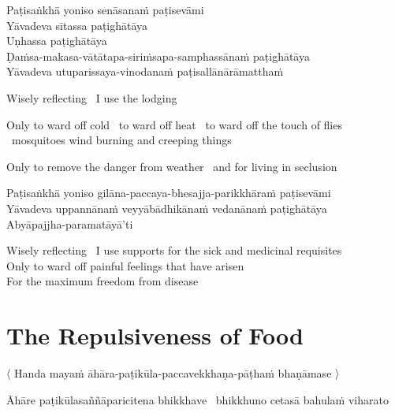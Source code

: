 Paṭisaṅkhā yoniso senāsanaṁ paṭisevāmi\\
Yāvadeva sītassa paṭighātāya\\
Uṇhassa paṭighātāya\\
Ḍaṁsa-makasa-vātātapa-siriṁsapa-samphassānaṁ paṭighātāya\\
Yāvadeva utuparissaya-vinodanaṁ paṭisallānārāmatthaṁ

\begin{english-keepwith}
  Wisely reflecting \breathmark\ I use the lodging
\begin{english-hangtogether}
  Only to ward off cold \breathmark\ to ward off heat \breathmark\ to ward off the touch of flies \breathmark\ mosquitoes wind burning and creeping things
\end{english-hangtogether}
\begin{english-hangtogether}
  Only to remove the danger from weather \breathmark\ and for living in seclusion
\end{english-hangtogether}
\end{english-keepwith}



Paṭisaṅkhā yoniso gilāna-paccaya-bhesajja-parikkhāraṁ paṭisevāmi\\
Yāvadeva uppannānaṁ veyyābādhikānaṁ vedanānaṁ paṭighātāya\\
Abyāpajjha-paramatāyā'ti

\begin{english-verses}
  Wisely reflecting \breathmark\ I use supports for the sick and medicinal requisites\\
  Only to ward off painful feelings that have arisen\\
  For the maximum freedom from disease
\end{english-verses}

\suttaRef{[MN 2]}


\section{The Repulsiveness of Food}
\label{repulsiveness-of-food}

\begin{leader}
  〈 Handa mayaṁ āhāra-paṭikūla-paccavekkhaṇa-pāṭhaṁ bhaṇāmase 〉
\end{leader}

\begin{pali-hang}
Āhāre paṭikūlasaññāparicitena bhikkhave \breathmark\ bhikkhuno cetasā bahulaṁ viharato
\end{pali-hang}

